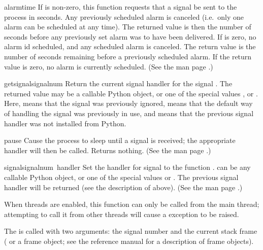 \begin{funcdesc}{alarm}{time}
  If  is non-zero, this function requests that a
   signal be sent to the process in  seconds.
  Any previously scheduled alarm is canceled (i.e.\ only one alarm can
  be scheduled at any time).  The returned value is then the number of
  seconds before any previously set alarm was to have been delivered.
  If  is zero, no alarm id scheduled, and any scheduled
  alarm is canceled.  The return value is the number of seconds
  remaining before a previously scheduled alarm.  If the return value
  is zero, no alarm is currently scheduled.  (See the \UNIX{} man page
  .)
\end{funcdesc}

\begin{funcdesc}{getsignal}{signalnum}
  Return the current signal handler for the signal .
  The returned value may be a callable Python object, or one of the
  special values ,  or
  .  Here,  means that the signal was
  previously ignored,  means that the default way
  of handling the signal was previously in use, and  means
  that the previous signal handler was not installed from Python.
\end{funcdesc}

\begin{funcdesc}{pause}{}
  Cause the process to sleep until a signal is received; the
  appropriate handler will then be called.  Returns nothing.  (See the
  \UNIX{} man page .)
\end{funcdesc}

\begin{funcdesc}{signal}{signalnum\, handler}
  Set the handler for signal  to the function
  .   can be any callable Python object, or
  one of the special values  or
  .  The previous signal handler will be returned
  (see the description of  above).  (See the \UNIX{}
  man page .)

  When threads are enabled, this function can only be called from the
  main thread; attempting to call it from other threads will cause a
   exception to be raised.

  The  is called with two arguments: the signal number
  and the current stack frame ( or a frame object; see the
  reference manual for a description of frame objects).
\end{funcdesc}
